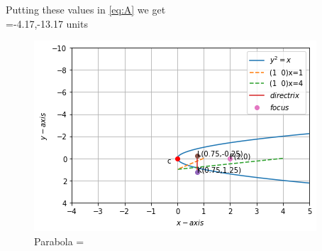 \documentclass[journal,12pt,twocolumn]{IEEEtran}
\begin{document}
Putting these values in \eqref{eq:A} we get\\
 =-4.17,-13.17 units


\begin{figure}[!ht]
\centering
\includegraphics[width=\columnwidth]{download.png}
\caption{Parabola  =  }
\label{fig:parab_tangent}	
\end{figure}
\end{document}
